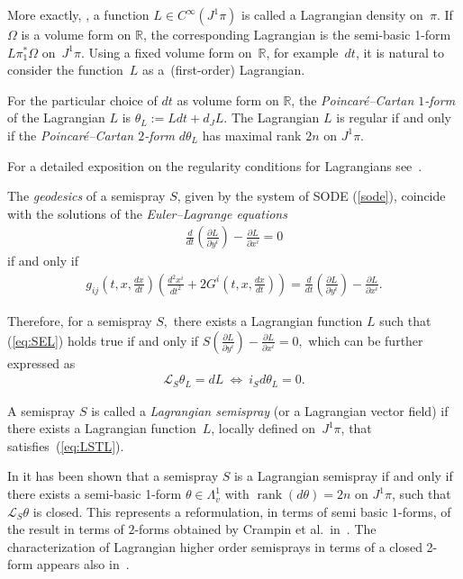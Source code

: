 \documentclass[11pt]{article}
\begin{document}
\begin{remark}
More exactly, \cite{saunders89}, a function $L\in C^{\infty}(J^{1}\pi)$
is called a Lagrangian density on~$\pi$. If~$\Omega$ is a volume
form on $\mathbb{R}$, the corresponding Lagrangian is the semi-basic
1-form $L\pi_{1}^{*}\Omega$ on~$J^{1}\pi$. Using a f\/ixed volume form
on~$\mathbb{R}$, for example~$dt$, it is natural to consider the
function~$L$ as a~(f\/irst-order) Lagrangian.
\end{remark}

For the particular choice of $dt$ as volume form on $\mathbb{R}$,
the \emph{Poincar\'e--Cartan $1$-form} of the Lagrangian $L$ is
$\theta_{L}:=Ldt+d_{J}L$. The Lagrangian $L$ is regular if and only
if the \emph{Poincar\'e--Cartan $2$-form} $d\theta_{L}$ has maximal
rank $2n$ on $J^{1}\pi$.

For a detailed exposition on the regularity conditions for Lagrangians
see~\cite{Krupkova}.


The \emph{geodesics} of a semispray $S$, given by the system of SODE
(\ref{sode}), coincide with the solutions of the \emph{Euler--Lagrange
equations} \begin{gather*}
\frac{d}{dt}\left(\frac{\partial L}{\partial y^{i}}\right)-\frac{\partial L}{\partial x^{i}}=0%
\end{gather*}
 if and only if \begin{gather}
g_{ij}\left(t,x,\frac{dx}{dt}\right)\left(\frac{d^{2}x^{i}}{dt^{2}}+2G^{i}\left(t,x,\frac{dx}{dt}\right)\right)=\frac{d}{dt}\left(\frac{\partial L}{\partial y^{i}}\right)-\frac{\partial L}{\partial x^{i}}.\label{eq:SEL}\end{gather}


Therefore, for a semispray $S,$ there exists a Lagrangian function
$L$ such that (\ref{eq:SEL}) holds true if and only if $S\left(\frac{\partial L}{\partial y^{i}}\right)-\frac{\partial L}{\partial x^{i}}=0,$
which can be further expressed as
\begin{gather}
\mathcal{L}_{S}\theta_{L}=dL \ \Leftrightarrow \ i_{S}d\theta_{L}=0.\label{eq:LSTL}
\end{gather}


\begin{definition}
A semispray $S$ is called a \emph{Lagrangian semispray} (or a Lagrangian
vector f\/ield) if there exists a Lagrangian function~$L$,
locally def\/ined on~$J^{1}\pi$, that satisf\/ies~(\ref{eq:LSTL}).
\end{definition}

In \cite{B-C-2010} it has been shown that a semispray $S$ is a Lagrangian
semispray if and only if there exists a semi-basic 1-form $\theta\in\Lambda_{v}^{1}$
with $\operatorname{rank}(d\theta)=2n$ on $J^{1}\pi$, such that
$\mathcal{L}_{S}\theta$ is closed. This represents a reformulation,
in terms of semi basic $1$-forms, of the result in terms of $2$-forms
obtained by Crampin et al.\ in~\cite{crampin84a}. The characterization
of Lagrangian higher order semisprays in terms of a closed 2-form
appears also in~\cite{anderso92}.
\end{document}
